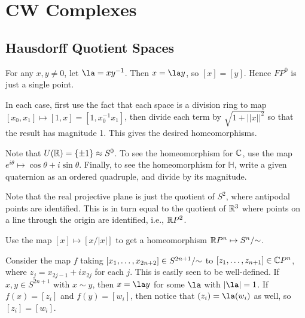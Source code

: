 \documentclass[../../solutions.tex]{subfiles}
\begin{document}
\section{CW Complexes}
\subsection{Hausdorff Quotient Spaces}
\begin{exercise} \leavevmode
For any $x,y\ne0$, let $\la=xy^{-1}$.
Then $x=\la y$, so $[x]=[y]$.
Hence $FP^0$ is just a single point.
\end{exercise}

\begin{exercise} \leavevmode
In each case, first use the fact that each space is a division ring to map $[x_0,x_1]\mapsto[1,x]=[1,x_0^{-1}x_1]$, then divide each term by $\sqrt{1+||x||^2}$ so that the result has magnitude 1.
This gives the desired homeomorphisms.
\end{exercise}

\begin{exercise} \leavevmode
Note that $U(\mathbb{R})=\{\pm1\}\approx S^0$.
To see the homeomorphism for $\mathbb{C}$, use the map $e^{i\theta}\mapsto\cos\theta+i\sin\theta$.
Finally, to see the homeomorphism for $\mathbb H$, write a given quaternion as an ordered quadruple, and divide by its magnitude.
\end{exercise}

\begin{exercise} \leavevmode
Note that the real projective plane is just the quotient of $S^2$, where antipodal points are identified.
This is in turn equal to the quotient of $\mathbb{R}^3$ where points on a line through the origin are identified, i.e., $\mathbb{R} P^2$.
\end{exercise}

\begin{exercise} \leavevmode
Use the map $[x]\mapsto[x/|x|]$ to get a homeomorphism $\mathbb{R} P^n\mapsto S^n/{\sim}$.
\end{exercise}

\begin{exercise} \leavevmode
Consider the map $f$ taking $[x_1,\dots,x_{2n+2}]\in S^{2n+1}/{\sim}$ to $[z_1,\dots,z_{n+1}]\in\mathbb{C} P^n$, where $z_j=x_{2j-1}+ix_{2j}$ for each $j$.
This is easily seen to be well-defined.
If $x,y\in S^{2n+1}$ with $x\sim y$, then $x=\la y$ for some $\la$ with $|\la|=1$.
If $f(x)=[z_i]$ and $f(y)=[w_i]$, then notice that $(z_i)=\la(w_i)$ as well, so $[z_i]=[w_i]$.
\end{exercise}
\end{document}
